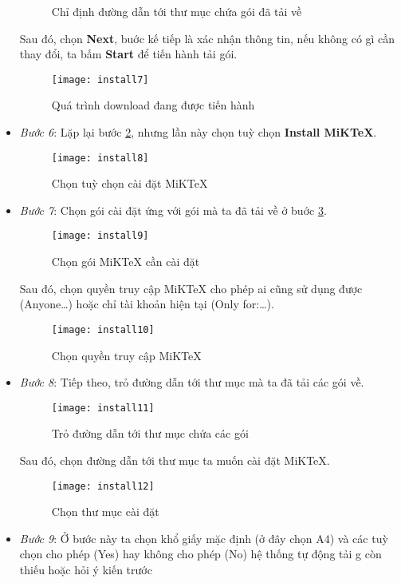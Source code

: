 \begin{itemize}
\begin{figure}[H]
  \caption{Chỉ định đường dẫn tới thư mục chứa gói đã tải về}
  \label{fig:dest}
 \end{figure}
 Sau đó, chọn \textbf{Next}, buớc kế tiếp là xác nhận thông tin, nếu không có gì cần thay đổi, ta
 bấm \textbf{Start} để tiến hành tải gói.
 \begin{figure}[H]
  \centering
  \texttt{[image: install7]}
  \caption{Quá trình download đang được tiến hành}
  \label{fig:downloading}
 \end{figure}
 \item \textsl{Bước 6}: Lặp lại bước \hyperlink{step:2}{2}, nhưng lần này chọn tuỳ chọn \textbf{Install MiKTeX}.
 \begin{figure}[H]
  \centering
  \texttt{[image: install8]}
  \caption{Chọn tuỳ chọn cài đặt MiKTeX}
  \label{fig:install}
 \end{figure}
 \clearpage 
 \item \textsl{Bước 7}: Chọn gói cài đặt ứng với gói mà ta đã tải về ở buớc \hyperlink{step:3}{3}.
  \begin{figure}[H]
  \centering
  \texttt{[image: install9]}
  \caption{Chọn gói MiKTeX cần cài đặt}
  \label{fig:installset}
  \end{figure}
  Sau đó, chọn quyền truy cập MiKTeX cho phép ai cũng sử dụng được (Anyone\dots) hoặc chỉ tài khoản hiện tại
  (Only for:\dots).
  \begin{figure}[H]
  \centering
  \texttt{[image: install10]}
  \caption{Chọn quyền truy cập MiKTeX}
  \label{fig:share}
  \end{figure}
  \clearpage 
  \item \textsl{Bước 8}: Tiếp theo, trỏ đường dẫn tới thư mục mà ta đã tải các gói về.
  \begin{figure}[H]
  \centering
  \texttt{[image: install11]}
  \caption{Trỏ đường dẫn tới thư mục chứa các gói}
  \label{fig:packdest}
  \end{figure}
  Sau đó, chọn đường dẫn tới thư mục ta muốn cài đặt MiKTeX.
  \begin{figure}[H]
  \centering
  \texttt{[image: install12]}
  \caption{Chọn thư mục cài đặt}
  \label{fig:insdest}
  \end{figure}
  \clearpage 
  \item \textsl{Bước 9}: Ở bước này ta chọn khổ giấy mặc định (ở đây chọn A4) và các tuỳ chọn cho
  phép (Yes) hay không cho phép (No) hệ thống tự động tải g còn thiếu hoặc hỏi ý kiến trước

\end{itemize}
